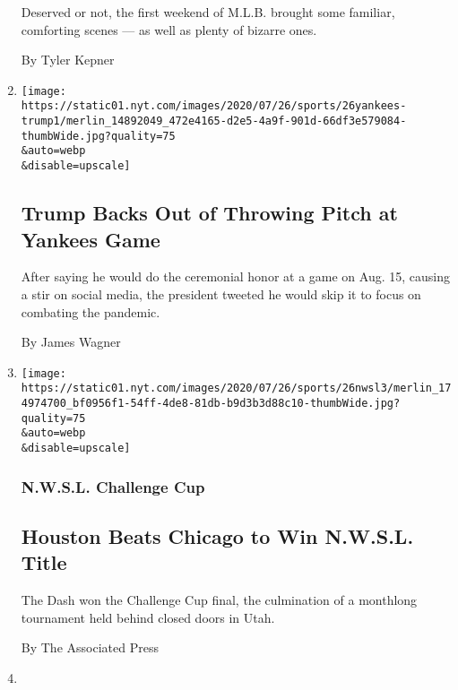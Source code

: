 \begin{enumerate}
  Deserved or not, the first weekend of M.L.B. brought some familiar,
  comforting scenes --- as well as plenty of bizarre ones.

  By Tyler Kepner
\item
  \href{/2020/07/26/sports/baseball/trump-yankees-pitch-deblasio.html}{}

  \texttt{[image: https://static01.nyt.com/images/2020/07/26/sports/26yankees-trump1/merlin\_14892049\_472e4165-d2e5-4a9f-901d-66df3e579084-thumbWide.jpg?quality=75\\\&auto=webp\\\&disable=upscale]}

  \hypertarget{trump-backs-out-of-throwing-pitch-at-yankees-game}{%
  \subsection{Trump Backs Out of Throwing Pitch at Yankees
  Game}\label{trump-backs-out-of-throwing-pitch-at-yankees-game}}

  After saying he would do the ceremonial honor at a game on Aug. 15,
  causing a stir on social media, the president tweeted he would skip it
  to focus on combating the pandemic.

  By James Wagner
\item
  \href{/2020/07/26/sports/soccer/houston-dash-nwsl.html}{}

  \texttt{[image: https://static01.nyt.com/images/2020/07/26/sports/26nwsl3/merlin\_174974700\_bf0956f1-54ff-4de8-81db-b9d3b3d88c10-thumbWide.jpg?quality=75\\\&auto=webp\\\&disable=upscale]}

  \hypertarget{nwsl-challenge-cup}{%
  \subsubsection{N.W.S.L. Challenge Cup}\label{nwsl-challenge-cup}}

  \hypertarget{houston-beats-chicago-to-win-nwsl-title}{%
  \subsection{Houston Beats Chicago to Win N.W.S.L.
  Title}\label{houston-beats-chicago-to-win-nwsl-title}}

  The Dash won the Challenge Cup final, the culmination of a monthlong
  tournament held behind closed doors in Utah.

  By The Associated Press
\item
  \href{/2020/07/26/sports/soccer/premier-league-decision-day.html}{}


\end{enumerate}

